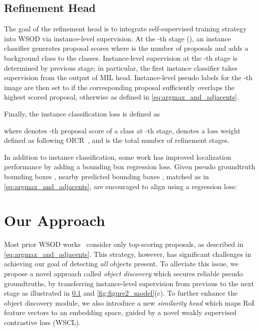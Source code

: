 \documentclass[runningheads]{llncs}
\begin{document}
\par

\subsection{Refinement Head}
\label{sec:REF}
The goal of the refinement head is to integrate self-supervised training strategy into WSOD via instance-level supervision. 
At the -th stage (), an instance classifier generates proposal scores  where  is the number of proposals and  adds a background class to the  classes.
Instance-level supervision at the -th stage is determined by previous stage; in particular, the first instance classifier takes supervision from the output of MIL head.
Instance-level pseudo labels for the -th image  are then set to  if the corresponding proposal sufficiently overlaps the highest scored proposal, otherwise  as defined in \eqref{eq:argmax_and_adjacents}.

Finally, the instance classification loss  is defined as

where  denotes -{th} proposal score of a class  at -th stage,  denotes a loss weight defined as  following OICR~\cite{Tang_2017_CVPR}, and  is the total number of refinement stages.
  
In addition to instance classification, some work \cite{zeng2019wsod2,Yang_2019_ICCV} has improved localization performance by adding a bounding box regression loss.
Given  pseudo groundtruth bounding boxes ,
nearby predicted bounding boxes , matched as in \eqref{eq:argmax_and_adjacents},
are encouraged to align using a  regression loss:



\section{Our Approach}
\label{sec:approach}
Most prior WSOD works~\cite{Tang_2017_CVPR,huang2020comprehensive} consider only top-scoring proposals, as described in \eqref{eq:argmax_and_adjacents}.
This strategy, however, has significant challenges in achieving our goal of detecting \emph{all} objects present.
To alleviate this issue, we propose a novel approach called \textit{object discovery} which secures reliable pseudo groundtruths, by transferring instance-level supervision from previous to the next stage as illustrated in \cref{sec:REF} and \cref{fig:figure2_model}(c).
To further enhance the object discovery module, we also introduce a new \textit{similarity head} which maps RoI feature vectors to an embedding space, guided by a novel weakly supervised contrastive loss (WSCL).
\end{document}
